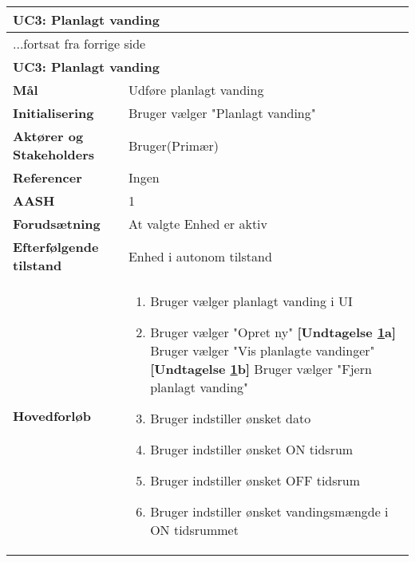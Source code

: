 \begin{center} \centering \label{UC3} 
	\begin{longtable}{|p{5cm}|p{9cm}|}  %
	\hline
		\multicolumn{2}{|l|}{\textbf{UC3: Planlagt vanding}} \\\hline %
		\endfirsthead
		
		\multicolumn{2}{l}{...fortsat fra forrige side} \\ \hline %
		\multicolumn{2}{|l|}{\textbf{UC3: Planlagt vanding}} \\\hline %
		\endhead	
		
		\textbf{Mål}								&Udføre planlagt vanding			\\\hline
		\textbf{Initialisering}					&Bruger vælger "Planlagt vanding"			\\\hline
		\textbf{Aktører og Stakeholders}			&Bruger(Primær)			\\\hline
		\textbf{Referencer}						&Ingen					\\\hline
		\textbf{AASH}							&1 						\\\hline
		\textbf{Forudsætning}					&At valgte Enhed er aktiv			\\\hline
		\textbf{Efterfølgende tilstand}			&Enhed i autonom tilstand			\\\hline
		\textbf{Hovedforløb}					
			&\begin{enumerate}
	
				\item \label{uc3valg}Bruger vælger planlagt vanding i UI 
				
				\item Bruger vælger "Opret ny"\newline
					  \textbf{[Undtagelse \ref{uc3valg}a]} 	\newline
					  Bruger vælger "Vis planlagte vandinger"\newline
					  \textbf{[Undtagelse \ref{uc3valg}b]} 	\newline
					  Bruger vælger "Fjern planlagt vanding"
				
				\item Bruger indstiller ønsket dato
				
				\item Bruger indstiller ønsket ON tidsrum
				
				\item Bruger indstiller ønsket OFF tidsrum
				
				\item Bruger indstiller ønsket vandingsmængde i ON tidsrummet
				

\end{enumerate}
\end{longtable}
\end{center}
